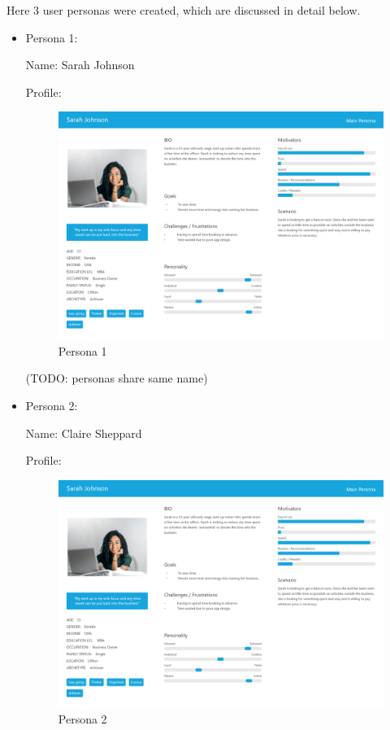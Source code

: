 \documentclass[12pt]{article}
\begin{document}
	Here 3 user personas were created, which are discussed in detail below.
	\begin{itemize}
		\item Persona 1: 
		
		Name: Sarah Johnson
		
		Profile: 
		\begin{figure}[H]
			
			\includegraphics[scale=0.2]{images/persona_1.png}
			\caption{Persona 1}
			\label{fig:persona_1}
		\end{figure}
	
		(TODO: personas share same name)
		
		\item Persona 2:
		
		Name:  Claire Sheppard
		
		
		Profile: 
		\begin{figure}[H]
			
			\includegraphics[scale=0.2]{images/persona_1.png}
			\caption{Persona 2}
			\label{fig:persona_2}
		\end{figure}
		

\end{itemize}
\end{document}
